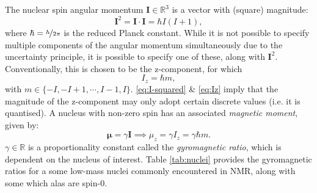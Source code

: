 The nuclear spin angular momentum $\symbf{I} \in
\mathbb{R}^3$ is a vector with (square) magnitude:
\begin{equation}
  \symbf{I}^2 = \symbf{I} \cdot \symbf{I} = \hbar I (I + 1),
  \label{eq:I-squared}
\end{equation}
where $\hbar = \nicefrac{h}{2 \pi}$ is the reduced Planck constant. While it
is not possible to specify multiple components of the angular momentum
simultaneously due to the uncertainty principle, it is possible to specify one
of these, along with $\symbf{I}^2$. Conventionally, this is chosen to be the
z-component, for which
\begin{equation}
  I_z = \hbar m,
  \label{eq:Iz}
\end{equation}
with $m \in \lbrace -I, -I+1, \cdots, I - 1, I \rbrace$. \eqref{eq:I-squared} \& \eqref{eq:Iz}
imply that the magnitude of the z-component may only adopt certain discrete
values (i.e. it is quantised). A nucleus with non-zero spin has an associated
\textit{magnetic moment}, given by:
\begin{equation}
  \symbf{\mu} = \gamma \symbf{I} \implies \mu_z = \gamma I_z = \gamma \hbar m.
\end{equation}
$\gamma \in \mathbb{R}$ is a proportionality constant called the
\textit{gyromagnetic ratio}, which is dependent on the nucleus of interest.
Table \ref{tab:nuclei} provides the gyromagnetic ratios for a some low-mass
nuclei commonly encountered in NMR, along with some which alas are spin-$0$.

